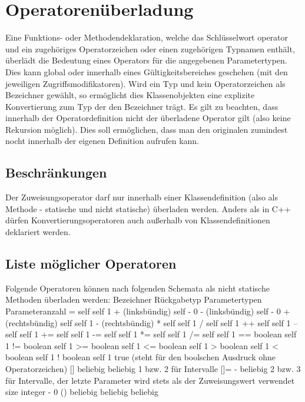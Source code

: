 \chapter{Operatorenüberladung}
Eine Funktions- oder Methodendeklaration, welche das Schlüsselwort operator und ein zugehöriges Operatorzeichen oder einen zugehörigen Typnamen enthält, überlädt die Bedeutung eines
Operators für die angegebenen Parametertypen.
Dies kann global oder innerhalb eines Gültigkeitsbereiches geschehen (mit den jeweiligen Zugriffsmodifikatoren).
Wird ein Typ und kein Operatorzeichen als Bezeichner gewählt, so ermöglicht dies Klassenobjekten eine explizite Konvertierung zum Typ der den Bezeichner trägt.
Es gilt zu beachten, dass innerhalb der Operatordefinition nicht der überladene Operator gilt (also keine Rekursion möglich). Dies soll ermöglichen,
dass man den originalen zumindest nocht innerhalb der eigenen Definition aufrufen kann.

\section{Beschränkungen}
Der Zuweisungsoperator darf nur innerhalb einer Klassendefinition (also als Methode - statische und nicht statische) überladen werden.
Anders als in C++ dürfen Konvertierungsoperatoren auch außerhalb von Klassendefinitionen deklariert werden.

\section{Liste möglicher Operatoren}
Folgende Operatoren können nach folgenden Schemata als nicht statische Methoden überladen werden:
Bezeichner			Rückgabetyp			Parametertypen		Parameteranzahl
=				self				self			1
+ (linksbündig)			self				-			0
- (linksbündig)			self				-			0
+ (rechtsbündig)		self				self			1
- (rechtsbündig)
*				self				self			1
/				self				self			1
++				self				self			1
--				self				self			1
+=				self				self			1
-=				self				self			1
*=				self				self			1
/=				self				self			1
==				boolean				self			1
!=				boolean				self			1
>=				boolean				self			1
<=				boolean				self			1
>				boolean				self			1
<				boolean				self			1
!				boolean				self			1
true (steht für den boolschen Ausdruck ohne Operatorzeichen)
[]				beliebig			beliebig		1 bzw. 2 für Intervalle
[]=				-				beliebig		2 bzw. 3 für Intervalle, der letzte Parameter wird stets als der Zuweisungswert verwendet
size				integer				-			0
()				beliebig			beliebig		beliebig

